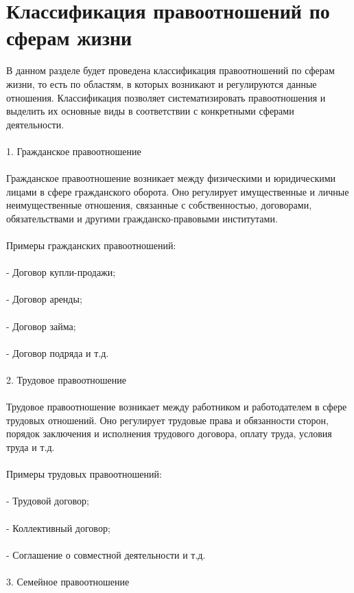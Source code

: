 \documentclass{article}
\begin{document}
\newpage
\section{Классификация правоотношений по сферам жизни}
В данном разделе будет проведена классификация правоотношений по сферам жизни, то есть по областям, в которых возникают и регулируются данные отношения. Классификация позволяет систематизировать правоотношения и выделить их основные виды в соответствии с конкретными сферами деятельности.\\
~\\
1. Гражданское правоотношение\\
~\\
Гражданское правоотношение возникает между физическими и юридическими лицами в сфере гражданского оборота. Оно регулирует имущественные и личные неимущественные отношения, связанные с собственностью, договорами, обязательствами и другими гражданско-правовыми институтами.\\
~\\
Примеры гражданских правоотношений:\\
~\\
- Договор купли-продажи;\\
~\\
- Договор аренды;\\
~\\
- Договор займа;\\
~\\
- Договор подряда и т.д.\\
~\\
2. Трудовое правоотношение\\
~\\
Трудовое правоотношение возникает между работником и работодателем в сфере трудовых отношений. Оно регулирует трудовые права и обязанности сторон, порядок заключения и исполнения трудового договора, оплату труда, условия труда и т.д.\\
~\\
Примеры трудовых правоотношений:\\
~\\
- Трудовой договор;\\
~\\
- Коллективный договор;\\
~\\
- Соглашение о совместной деятельности и т.д.\\
~\\
3. Семейное правоотношение\\
~\\
\end{document}
